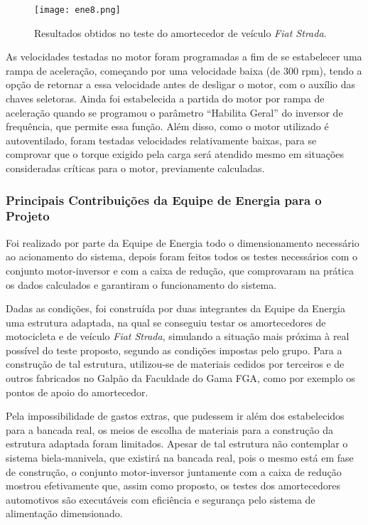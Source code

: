 	\begin{figure}[!hbtp]
		\centering
		\texttt{[image: ene8.png]}
		\caption{Resultados obtidos no teste do amortecedor de veículo \textit{Fiat Strada}.} 
		\label{ene8}
	\end{figure}

	As velocidades testadas no motor foram programadas a fim de se estabelecer uma rampa de aceleração, começando por uma velocidade baixa (de 300 rpm), tendo a opção de retornar a essa velocidade antes de desligar o motor, com o auxílio das chaves seletoras. Ainda foi estabelecida a partida do motor por rampa de aceleração quando se programou o parâmetro “Habilita Geral” do inversor de frequência, que permite essa função. Além disso, como o motor utilizado é autoventilado, foram testadas velocidades relativamente baixas, para se comprovar que o torque exigido pela carga será atendido mesmo em situações consideradas críticas para o motor, previamente calculadas.

\subsubsection{Principais Contribuições da Equipe de Energia para o Projeto}
	
	Foi realizado por parte da Equipe de Energia todo o dimensionamento necessário ao acionamento do sistema, depois foram feitos todos os testes necessários com o conjunto motor-inversor e com a caixa de redução, que comprovaram na prática os dados calculados e garantiram o funcionamento do sistema. 
	
	Dadas as condições, foi construída por duas integrantes da Equipe da Energia uma estrutura adaptada, na qual se conseguiu testar os amortecedores de motocicleta e de veículo \textit{Fiat Strada}, simulando a situação mais próxima à real possível do teste proposto, segundo as condições impostas pelo grupo. Para a construção de tal estrutura, utilizou-se de materiais cedidos por terceiros e de outros fabricados no Galpão da Faculdade do Gama FGA, como por exemplo os pontos de apoio do amortecedor. 
	
	Pela impossibilidade de gastos extras, que pudessem ir além dos estabelecidos para a bancada real, os meios de escolha de materiais para a construção da estrutura adaptada foram limitados. Apesar de tal estrutura não contemplar o sistema biela-manivela, que existirá na bancada real, pois o mesmo está em fase de construção, o conjunto motor-inversor juntamente com a caixa de redução mostrou efetivamente que, assim como proposto, os testes dos amortecedores automotivos são executáveis com eficiência e segurança pelo sistema de alimentação dimensionado.



